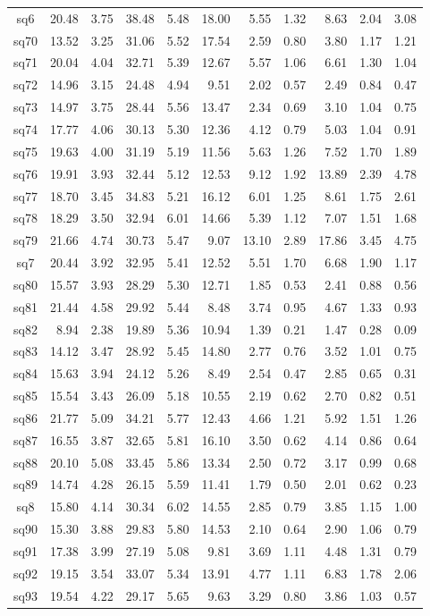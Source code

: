 {\begin{longtable}{@{}cr@{\hspace{1em}}r@{\hspace{1em}}r@{\hspace{1em}}r@{\hspace{1em}}r@{\hspace{2em}}r@{\hspace{1em}}r@{\hspace{1em}}r@{\hspace{1em}}r@{\hspace{1em}}r@{}}
sq6&20.48&3.75&38.48&5.48&18.00&5.55&1.32&8.63&2.04&3.08\\
sq70&13.52&3.25&31.06&5.52&17.54&2.59&0.80&3.80&1.17&1.21\\
sq71&20.04&4.04&32.71&5.39&12.67&5.57&1.06&6.61&1.30&1.04\\
sq72&14.96&3.15&24.48&4.94&9.51&2.02&0.57&2.49&0.84&0.47\\
sq73&14.97&3.75&28.44&5.56&13.47&2.34&0.69&3.10&1.04&0.75\\
sq74&17.77&4.06&30.13&5.30&12.36&4.12&0.79&5.03&1.04&0.91\\
sq75&19.63&4.00&31.19&5.19&11.56&5.63&1.26&7.52&1.70&1.89\\
sq76&19.91&3.93&32.44&5.12&12.53&9.12&1.92&13.89&2.39&4.78\\
sq77&18.70&3.45&34.83&5.21&16.12&6.01&1.25&8.61&1.75&2.61\\
sq78&18.29&3.50&32.94&6.01&14.66&5.39&1.12&7.07&1.51&1.68\\
sq79&21.66&4.74&30.73&5.47&9.07&13.10&2.89&17.86&3.45&4.75\\
sq7&20.44&3.92&32.95&5.41&12.52&5.51&1.70&6.68&1.90&1.17\\
sq80&15.57&3.93&28.29&5.30&12.71&1.85&0.53&2.41&0.88&0.56\\
sq81&21.44&4.58&29.92&5.44&8.48&3.74&0.95&4.67&1.33&0.93\\
sq82&8.94&2.38&19.89&5.36&10.94&1.39&0.21&1.47&0.28&0.09\\
sq83&14.12&3.47&28.92&5.45&14.80&2.77&0.76&3.52&1.01&0.75\\
sq84&15.63&3.94&24.12&5.26&8.49&2.54&0.47&2.85&0.65&0.31\\
sq85&15.54&3.43&26.09&5.18&10.55&2.19&0.62&2.70&0.82&0.51\\
sq86&21.77&5.09&34.21&5.77&12.43&4.66&1.21&5.92&1.51&1.26\\
sq87&16.55&3.87&32.65&5.81&16.10&3.50&0.62&4.14&0.86&0.64\\
sq88&20.10&5.08&33.45&5.86&13.34&2.50&0.72&3.17&0.99&0.68\\
sq89&14.74&4.28&26.15&5.59&11.41&1.79&0.50&2.01&0.62&0.23\\
sq8&15.80&4.14&30.34&6.02&14.55&2.85&0.79&3.85&1.15&1.00\\
sq90&15.30&3.88&29.83&5.80&14.53&2.10&0.64&2.90&1.06&0.79\\
sq91&17.38&3.99&27.19&5.08&9.81&3.69&1.11&4.48&1.31&0.79\\
sq92&19.15&3.54&33.07&5.34&13.91&4.77&1.11&6.83&1.78&2.06\\
sq93&19.54&4.22&29.17&5.65&9.63&3.29&0.80&3.86&1.03&0.57\\

\end{longtable}}
